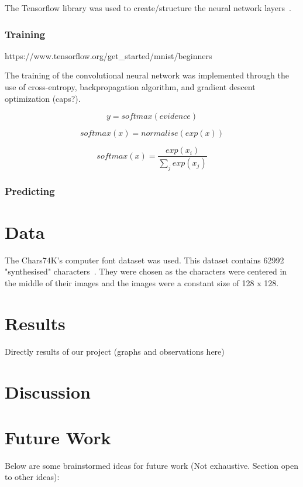 \documentclass[11pt]{article}
\begin{document}
The Tensorflow library was used to create/structure the neural network layers~\cite{tensorflow15-whitepaper}.


\subsubsection{Training}
https://www.tensorflow.org/get_started/mnist/beginners

The training of the convolutional neural network was implemented through the use of cross-entropy, backpropagation algorithm, and gradient descent optimization (caps?).



\begin{equation}
    y = softmax(evidence)    
\end{equation}

\begin{equation}
    softmax(x) = normalise(exp(x))
\end{equation}

\begin{equation}
    softmax(x) = \frac{exp(x_{i})}{\sum_{j} exp(x_{j})}
\end{equation}


\subsubsection{Predicting}

\section{Data}
The Chars74K's computer font dataset was used. This dataset contains 62992 "synthesised" characters~\cite{deCampos09}. They were chosen as the characters were centered in the middle of their images and the images were a constant size of 128 x 128.

\section{Results}
Directly results of our project (graphs and observations here)

\section{Discussion}


\section{Future Work}
Below are some brainstormed ideas for future work (Not exhaustive.  Section open to other ideas): 
\end{document}
